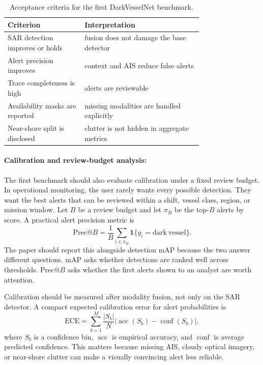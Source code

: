 \documentclass{article}
\begin{document}
\begin{table}[t]
\centering
\caption{Acceptance criteria for the first DarkVesselNet benchmark.}
\begin{tabular}{@{}p{0.30\linewidth}p{0.46\linewidth}@{}}
\toprule
\textbf{Criterion} & \textbf{Interpretation}\\
\midrule
SAR detection improves or holds & fusion does not damage the base detector\\
Alert precision improves & context and AIS reduce false alerts\\
Trace completeness is high & alerts are reviewable\\
Availability masks are reported & missing modalities are handled explicitly\\
Near-shore split is disclosed & clutter is not hidden in aggregate metrics\\
\bottomrule
\end{tabular}
\end{table}

\paragraph{Calibration and review-budget analysis:}

The first benchmark should also evaluate calibration under a fixed review budget. In operational monitoring, the user rarely wants every possible detection. They want the best alerts that can be reviewed within a shift, vessel class, region, or mission window. Let $B$ be a review budget and let $\pi_B$ be the top-$B$ alerts by score. A practical alert precision metric is
\begin{equation}
  \mathrm{Prec}@B =
  \frac{1}{B}
  \sum_{i\in \pi_B}
  \mathbf{1}\{y_i=\mathrm{dark\ vessel}\}.
\end{equation}
The paper should report this alongside detection mAP because the two answer different questions. mAP asks whether detections are ranked well across thresholds. $\mathrm{Prec}@B$ asks whether the first alerts shown to an analyst are worth attention.

Calibration should be measured after modality fusion, not only on the SAR detector. A compact expected calibration error for alert probabilities is
\begin{equation}
  \mathrm{ECE} =
  \sum_{b=1}^{M}
  \frac{|S_b|}{N}
  \left|
    \operatorname{acc}(S_b)-\operatorname{conf}(S_b)
  \right|,
\end{equation}
where $S_b$ is a confidence bin, $\operatorname{acc}$ is empirical accuracy, and $\operatorname{conf}$ is average predicted confidence. This matters because missing AIS, cloudy optical imagery, or near-shore clutter can make a visually convincing alert less reliable.
\end{document}
